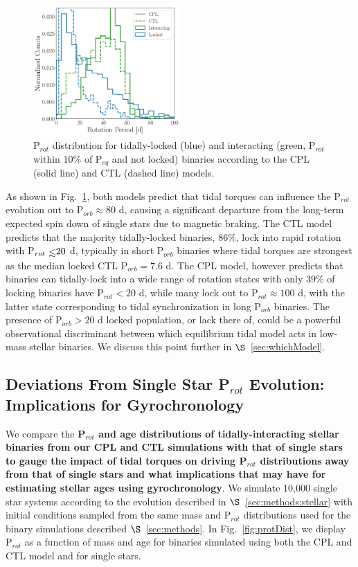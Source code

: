 \documentclass[twocolumn]{aastex61}
\def\lsim{~\rlap{$<$}{\lower 1.0ex\hbox{$\sim$}}}
\newcommand{\xxx}[1]{{\textbf{#1}}}
\begin{document}
\begin{figure}
	\includegraphics[width=0.5\textwidth]{../Plots/lockedProtHist.pdf}
   \caption{P$_{rot}$ distribution for tidally-locked (blue) and interacting (green, P$_{rot}$ within $10\%$ of P$_{eq}$ and not locked) binaries according to the CPL (solid line) and CTL (dashed line) models.}%
    \label{fig:lockedProtHist}%
\end{figure}

As shown in Fig.~\ref{fig:lockedProtHist}, both models predict that tidal torques can influence the P$_{rot}$ evolution out to P$_{orb} \approx 80$ d, causing a significant departure from the long-term expected spin down of single stars due to magnetic braking.  The CTL model predicts that the majority tidally-locked binaries, $86\%$, lock into rapid rotation with P$_{rot} \lsim 20$ d, typically in short P$_{orb}$ binaries where tidal torques are strongest as the median locked CTL P$_{orb} = 7.6$ d. The CPL model, however predicts that binaries can tidally-lock into a wide range of rotation states with only $39\%$ of locking binaries have P$_{rot} < 20$ d, while many lock out to P$_{rot} \approx 100$ d, with the latter state corresponding to tidal synchronization in long P$_{orb}$ binaries.  The presence of P$_{orb} > 20$ d locked population, or lack there of, could be a powerful observational discriminant between which equilibrium tidal model acts in low-mass stellar binaries.  We discuss this point further in $\S$~\ref{sec:whichModel}.

\subsection{Deviations From Single Star P$_{rot}$ Evolution: Implications for Gyrochronology} \label{sec:gyro}

We compare the \xxx{P$_{rot}$ and age distributions of tidally-interacting stellar binaries from our CPL and CTL simulations with that of single stars to gauge the impact of tidal torques on driving P$_{rot}$ distributions away from that of single stars and what implications that may have for estimating stellar ages using gyrochronology}.  We simulate 10,000 single star systems according to the evolution described in $\S$~\ref{sec:methods:stellar} with initial conditions sampled from the same mass and P$_{rot}$ distributions used for the binary simulations described $\S$~\ref{sec:methods}. In Fig.~\ref{fig:protDist}, we display P$_{rot}$ as a function of mass and age for binaries simulated using both the CPL and CTL model and for single stars.
\end{document}
